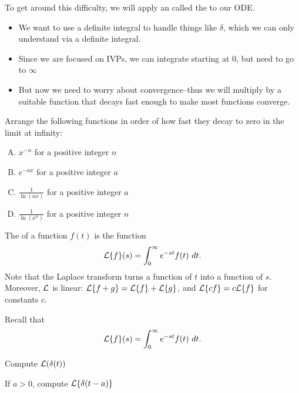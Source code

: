 \begin{applicationActivities}
\begin{observation}
To get around this difficulty, we will apply an  called the  to our ODE.
\vfill
\begin{itemize}
\item We want to use a definite integral to handle things like \(\delta\), which we can only understand via a definite integral.
\item Since we are focused on IVPs, we can integrate starting at \(0\), but need to go to \(\infty\)
\item But now we need to worry about convergence--thus we will multiply by a suitable function that decays fast enough to make most functions converge.
\end{itemize}
\end{observation}

\begin{activity}{5}
Arrange the following functions in order of how fast they decay to zero in the limit at infinity:
\begin{enumerate}[(A)]
\item \(x^{-n}\) for a positive integer \(n\)
\item \(e^{-ax}\) for a positive integer \(a\)
\item \(\frac{1}{\ln(ax)}\) for a positive integer \(a\)
\item \(\frac{1}{\ln(x^n)}\) for a positive integer \(n\)
\end{enumerate}
\end{activity}

\begin{definition}
The  of a function \(f(t)\) is the function
\[\mathcal{L}\{f\}(s)=\int _0 ^\infty e^{-st}f(t)\ dt.\]
\vfill
Note that the Laplace transform turns a function of \(t\) into a function of \(s\).
\vfill
Moreover, \(\mathcal{L}\) is linear: \(\mathcal{L}\{f+g\}=\mathcal{L}\{f\}+\mathcal{L}\{g\}\), and \(\mathcal{L}\{cf\}=c\mathcal{L}\{f\}\) for constants \(c\).
\end{definition}


\begin{activity}{5}
Recall that \[\mathcal{L}\{f\}(s)=\int _0 ^\infty e^{-st} f(t)\ dt.\]
\begin{subactivity}
Compute \(\mathcal{L}(\delta(t))\)
\end{subactivity}
\begin{subactivity}
If \(a>0\), compute \(\mathcal{L}\{\delta(t-a)\}\)
\end{subactivity}
\end{activity}


\end{applicationActivities}
